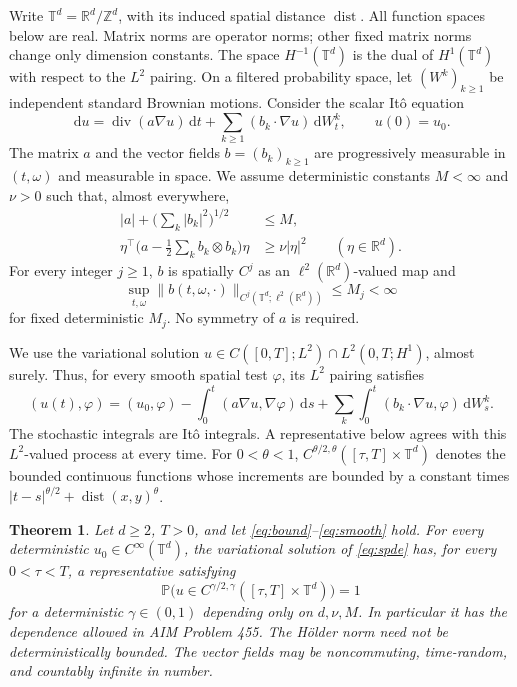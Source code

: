 \documentclass[11pt]{article}
\newtheorem{theorem}{Theorem}[section]
\newcommand{\T}{\mathbb T}
\newcommand{\R}{\mathbb R}
\newcommand{\PP}{\mathbb P}
\newcommand{\diver}{\operatorname{div}}
\newcommand{\dd}{\,\mathrm d}
\begin{document}
Write $\T^d=\R^d/\mathbb Z^d$, with its induced spatial distance
$\operatorname{dist}$. All function spaces below are real. Matrix norms are
operator norms; other fixed matrix norms change only dimension constants.
The space $H^{-1}(\T^d)$ is the dual of $H^1(\T^d)$ with respect
to the $L^2$ pairing. On a filtered probability space, let $(W^k)_{k\ge1}$
be independent standard Brownian motions. Consider the scalar It\^o equation
\begin{equation}\label{eq:spde}
 \dd u=\diver(a\nabla u)\dd t
       +\sum_{k\ge1}(b_k\cdot\nabla u)\dd W^k_t,
 \qquad u(0)=u_0.
\end{equation}
The matrix $a$ and the vector fields $b=(b_k)_{k\ge1}$ are progressively
measurable in $(t,\omega)$ and measurable in space. We assume deterministic
constants $M<\infty$ and $\nu>0$ such that, almost everywhere,
\begin{align}
 |a|+\Big(\sum_k|b_k|^2\Big)^{1/2}&\le M,\label{eq:bound}\\
 \eta^\top\Big(a-\tfrac12\sum_k b_k\otimes b_k\Big)\eta
       &\ge\nu|\eta|^2\qquad(\eta\in\R^d).\label{eq:parabolicity}
\end{align}
For every integer $j\ge1$, $b$ is spatially $C^j$ as an
$\ell^2(\R^d)$-valued map and
\begin{equation}\label{eq:smooth}
 \sup_{t,\omega}\|b(t,\omega,\cdot)\|_{C^j(\T^d;\ell^2(\R^d))}
 \le M_j<\infty
\end{equation}
for fixed deterministic $M_j$. No symmetry of $a$ is required.

We use the variational solution
$u\in C([0,T];L^2)\cap L^2(0,T;H^1)$, almost surely. Thus, for every
smooth spatial test $\varphi$, its $L^2$ pairing satisfies
\[
 (u(t),\varphi)=(u_0,\varphi)
 -\int_0^t(a\nabla u,\nabla\varphi)\dd s
 +\sum_k\int_0^t(b_k\cdot\nabla u,\varphi)\dd W^k_s.
\]
The stochastic integrals are It\^o integrals. A representative below agrees
with this $L^2$-valued process at every time. For $0<\theta<1$,
$C^{\theta/2,\theta}([\tau,T]\times\T^d)$ denotes the bounded continuous
functions whose increments are bounded by a constant times
$|t-s|^{\theta/2}+\operatorname{dist}(x,y)^\theta$.

\begin{theorem}\label{thm:main}
Let $d\ge2$, $T>0$, and let \eqref{eq:bound}--\eqref{eq:smooth} hold.
For every deterministic $u_0\in C^\infty(\T^d)$, the variational solution of
\eqref{eq:spde} has, for every $0<\tau<T$, a representative satisfying
\[
 \PP\bigl(u\in C^{\gamma/2,\gamma}([\tau,T]\times\T^d)\bigr)=1
\]
for a deterministic $\gamma\in(0,1)$ depending only on $d,\nu,M$.
In particular it has the dependence allowed in AIM Problem 455.
The H\"older norm need not be deterministically bounded. The vector fields
may be noncommuting, time-random, and countably infinite in number.
\end{theorem}
\end{document}
